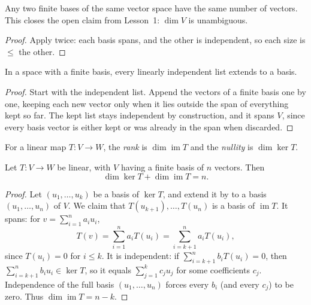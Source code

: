 \begin{corollary}\label{cor:dim-well-defined}
Any two finite bases of the same vector space have the same number of
vectors. This closes the open claim from Lesson~1: $\dim V$ is unambiguous.
\end{corollary}

\begin{proof}
Apply  twice: each basis spans, and the other is
independent, so each size is $\le$ the other.
\end{proof}

\begin{corollary}\label{cor:extend-basis}
In a space with a finite basis, every linearly independent list extends
to a basis.
\end{corollary}

\begin{proof}
Start with the independent list. Append the vectors of a finite basis one by one, keeping each new vector
only when it lies outside the span of everything kept so far. The kept
list stays independent by construction, and it spans $V$, since every
basis vector is either kept or was already in the span when discarded.
\end{proof}

\begin{definition}
For a linear map $T\colon V\to W$, the \emph{rank} is $\dim\operatorname{im}T$
and the \emph{nullity} is $\dim\ker T$.
\end{definition}

\begin{theorem}\label{thm:rank-nullity}
Let $T\colon V\to W$ be linear, with $V$ having a finite basis of $n$
vectors. Then
\[
  \dim\ker T+\dim\operatorname{im}T=n.
\]
\end{theorem}

\begin{proof}
Let $(u_1,\ldots,u_k)$ be a basis of $\ker T$, and extend it by
 to a basis $(u_1,\ldots,u_n)$ of $V$. We claim
that $T(u_{k+1}),\ldots,T(u_n)$ is a basis of $\operatorname{im}T$.
It spans: for $v=\sum_{i=1}^n a_iu_i$,
\[
  T(v)=\sum_{i=1}^n a_iT(u_i)=\sum_{i=k+1}^n a_iT(u_i),
\]
since $T(u_i)=0$ for $i\le k$. It is independent: if
$\sum_{i=k+1}^n b_iT(u_i)=0$, then $\sum_{i=k+1}^n b_iu_i\in\ker T$, so it
equals $\sum_{j=1}^k c_ju_j$ for some coefficients $c_j$. Independence of
the full basis $(u_1,\ldots,u_n)$ forces every $b_i$ (and every $c_j$) to
be zero. Thus $\dim\operatorname{im}T=n-k$.
\end{proof}

